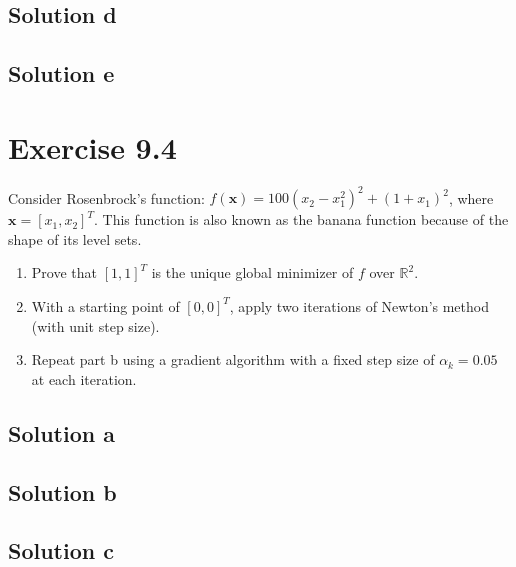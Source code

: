 \documentclass{article}
\newcommand{\bld}[1]{\boldsymbol{#1}}
\begin{document}
\subsection*{Solution d}
\subsection*{Solution e}
\section*{Exercise 9.4}
Consider Rosenbrock's function: $f(\bld{x})=100(x_2-x_1^2)^2+(1+x_1)^2$, where
$\bld{x}=[x_1,x_2]^T$. This function is also known as the banana function because of the shape of its level sets.
\begin{enumerate}[label=\alph*.]
\item Prove that $[1,1]^T$ is the unique global minimizer of $f$ over
	$\mathbb{R}^2$.
\item With a starting point of $[0,0]^T$, apply two iterations of Newton's
	method (with unit step size).
\item Repeat part b using a gradient algorithm with a fixed step size of
	$\alpha_k=0.05$ at each iteration.
\end{enumerate}
\subsection*{Solution a}
\subsection*{Solution b}
\subsection*{Solution c}
\end{document}

